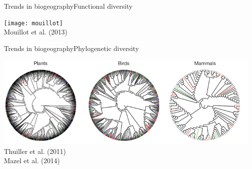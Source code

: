 \documentclass{eecslides}
\begin{document}

	\begin{frame}{Trends in biogeography}{Functional diversity}
		\begin{center}
		\texttt{[image: mouillot]}\\
		\footnotesize{Mouillot et al. (2013)}
		\end{center}
	\end{frame}


	\begin{frame}{Trends in biogeography}{Phylogenetic diversity}
		\begin{center}
		\includegraphics[height=0.45\textheight]{thuiller}\\
		\footnotesize{Thuiller et al. (2011)}\\
		\footnotesize{Mazel et al. (2014)}
		\end{center}
	\end{frame}



\end{document}
